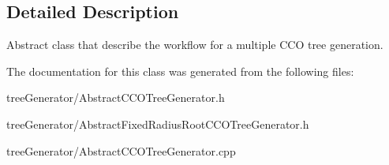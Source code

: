 \subsection{Detailed Description}
Abstract class that describe the workflow for a multiple C\+CO tree generation. 

The documentation for this class was generated from the following files\+:\begin{DoxyCompactItemize}
\item 
tree\+Generator/Abstract\+C\+C\+O\+Tree\+Generator.\+h\item 
tree\+Generator/Abstract\+Fixed\+Radius\+Root\+C\+C\+O\+Tree\+Generator.\+h\item 
tree\+Generator/Abstract\+C\+C\+O\+Tree\+Generator.\+cpp\end{DoxyCompactItemize}
